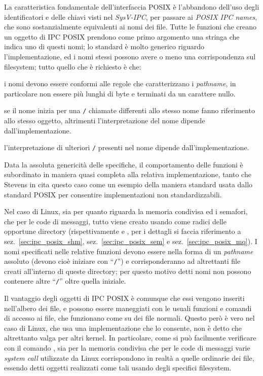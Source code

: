 La caratteristica fondamentale dell'interfaccia POSIX è l'abbandono dell'uso
degli identificatori e delle chiavi visti nel \textit{SysV-IPC}, per passare ai
 \textit{POSIX IPC names}, che sono sostanzialmente
equivalenti ai nomi dei file. Tutte le funzioni che creano un oggetto di IPC
POSIX prendono come primo argomento una stringa che indica uno di questi nomi;
lo standard è molto generico riguardo l'implementazione, ed i nomi stessi
possono avere o meno una corrispondenza sul filesystem; tutto quello che è
richiesto è che:
\begin{itemize*}
\item i nomi devono essere conformi alle regole che caratterizzano i
  \textit{pathname}, in particolare non essere più lunghi di 
  byte e terminati da un carattere nullo.
\item se il nome inizia per una \texttt{/} chiamate differenti allo stesso
  nome fanno riferimento allo stesso oggetto, altrimenti l'interpretazione del
  nome dipende dall'implementazione.
\item l'interpretazione di ulteriori \texttt{/} presenti nel nome dipende
  dall'implementazione.
\end{itemize*}

Data la assoluta genericità delle specifiche, il comportamento delle funzioni
è subordinato in maniera quasi completa alla relativa implementazione, tanto
che Stevens in \cite{UNP2} cita questo caso come un esempio della maniera
standard usata dallo standard POSIX per consentire implementazioni non
standardizzabili. 

Nel caso di Linux, sia per quanto riguarda la memoria condivisa ed i semafori,
che per le code di messaggi, tutto viene creato usando come radici delle
opportune directory (rispettivamente  e , per
i dettagli si faccia riferimento a sez.~\ref{sec:ipc_posix_shm},
sez.~\ref{sec:ipc_posix_sem} e sez.~\ref{sec:ipc_posix_mq}).  I nomi
specificati nelle relative funzioni devono essere nella forma di un
\textit{pathname} assoluto (devono cioè iniziare con ``\texttt{/}'') e
corrisponderanno ad altrettanti file creati all'interno di queste directory;
per questo motivo detti nomi non possono contenere altre ``\texttt{/}'' oltre
quella iniziale.

Il vantaggio degli oggetti di IPC POSIX è comunque che essi vengono inseriti
nell'albero dei file, e possono essere maneggiati con le usuali funzioni e
comandi di accesso ai file, che funzionano come su dei file normali. Questo
però è vero nel caso di Linux, che usa una implementazione che lo consente,
non è detto che altrettanto valga per altri kernel. In particolare, come si
può facilmente verificare con il comando , sia per la memoria
condivisa che per le code di messaggi varie \textit{system call} utilizzate da
Linux corrispondono in realtà a quelle ordinarie dei file, essendo detti
oggetti realizzati come tali usando degli specifici filesystem.


